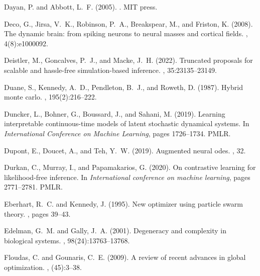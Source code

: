 \documentclass[12pt]{article}
\begin{document}
\begin{thebibliography}{}
Dayan, P. and Abbott, L.~F. (2005).
.
\newblock MIT press.

Deco, G., Jirsa, V.~K., Robinson, P.~A., Breakspear, M., and Friston, K.
  (2008).
\newblock The dynamic brain: from spiking neurons to neural masses and cortical
  fields.
, 4(8):e1000092.

Deistler, M., Goncalves, P.~J., and Macke, J.~H. (2022).
\newblock Truncated proposals for scalable and hassle-free simulation-based
  inference.
,
  35:23135--23149.

Duane, S., Kennedy, A.~D., Pendleton, B.~J., and Roweth, D. (1987).
\newblock Hybrid monte carlo.
, 195(2):216--222.

Duncker, L., Bohner, G., Boussard, J., and Sahani, M. (2019).
\newblock Learning interpretable continuous-time models of latent stochastic
  dynamical systems.
\newblock In {\em International Conference on Machine Learning}, pages
  1726--1734. PMLR.

Dupont, E., Doucet, A., and Teh, Y.~W. (2019).
\newblock Augmented neural odes.
, 32.

Durkan, C., Murray, I., and Papamakarios, G. (2020).
\newblock On contrastive learning for likelihood-free inference.
\newblock In {\em International conference on machine learning}, pages
  2771--2781. PMLR.

Eberhart, R.~C. and Kennedy, J. (1995).
\newblock New optimizer using particle swarm theory.
, pages 39--43.

Edelman, G.~M. and Gally, J.~A. (2001).
\newblock Degeneracy and complexity in biological systems.
,
  98(24):13763--13768.

Floudas, C. and Gounaris, C.~E. (2009).
\newblock A review of recent advances in global optimization.
, (45):3--38.


\end{thebibliography}
\end{document}
